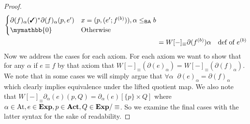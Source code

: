\documentclass[a4paper,UKenglish,cleveref, autoref, thm-restate]{lipics-v2021}
\newcommand{\cmark}{\text{\ding{51}}}
\newcommand{\Act}{\textbf{\upshape{Act}}}
\newcommand{\At}{\text{\upshape{At}}}
\newcommand{\Exp}{\textbf{\upshape{Exp}}}
\newcommand{\BA}{\textsf{BA}}
\newcommand{\babort}{\mymathbb{0}}
\theoremstyle{plain}\newtheoremrep{thm}{Theorem}[section]
\begin{document}
\begin{toappendix}
\begin{proof}
\begin{align*}
\begin{cases}
					\partial(f)_\alpha(\cmark)^{*}\partial(f)_\alpha(p, e^\prime)& x=(p, (e^\prime;f^{(b)})), \alpha \leq_{\BA} b\\
					\babort& \text{Otherwise}\\
				\end{cases} &\\
				&=W[-]_\equiv\partial (f^{(b)})\alpha & \text{def of }e^{(b)}
			\end{align*}
			Now we address the cases for each axiom. For each axiom we want to show that for any $\alpha$ if $e \equiv f$ by that axiom that $W[-]_\equiv (\partial(e)_\alpha) = W[-]_\equiv (\partial(f)_\alpha)$. We note that in some cases we will simply argue that $\forall \alpha \;\; \partial(e)_\alpha = \partial(f)_\alpha$ which clearly implies equivalence under the lifted quotient map. We also note that $W[-]_\equiv \partial_\alpha(e)(p, Q) = \partial_\alpha(e)[\{p\}\times Q]$ where $\alpha \in \At, e \in \Exp, p \in \Act, Q \in \Exp/\equiv$. So we examine the final cases with the latter syntax for the sake of readability.
			

\end{proof}
\end{toappendix}
\end{document}
